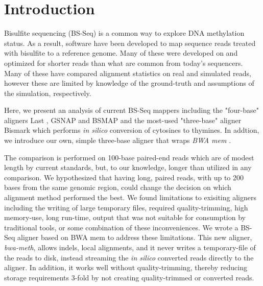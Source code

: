 \documentclass{bioinfo}
\begin{document}
\section{Introduction}
Bisulfite sequencing (BS-Seq) is a common way to explore DNA methylation status.
As a result, software \citep{frithlast,methylcoder,gsnap,krueger2011,bsmap,bsmooth}
have been developed to map sequence reads treated with bisulfite to a reference genome.
Many of these were developed on and optimized for shorter reads
than what are common from today's sequencers. Many of these have compared alignment
statistics on real \citep{methylcoder,bsmap} and simulated \citep{frithlast} reads,
however these are limited by knowledge of the ground-truth and assumptions of
the simulation, respectively.

Here, we present an analysis of current BS-Seq mappers including the "four-base" aligners
Last \citep{frithlast}, GSNAP \citep{gsnap} and BSMAP \citep{bsmap} and the most-used
"three-base" aligner Bismark \citep{krueger2011} which performs \emph{in silico} conversion
of cytosines to thymines. In addtion, we introduce our
own, simple three-base aligner that wraps \textit{BWA mem} \citep{bwamem}.

The comparison is performed on 100-base paired-end reads
which are of modest length by current standards, but, to our knowledge, longer than
utilized in any comparison. We hypothesized that having long, paired reads, with up
to 200 bases from the same genomic region, could change the decision on which
alignment method performed the best. 
We found limitations to exisiting aligners including the writing of large temporary
files, required quality-trimming, high memory-use, long run-time, output that was not
suitable for consumption by traditional tools, or some combination of these
inconveniences. We wrote
a BS-Seq aligner based on BWA mem \citep{bwamem} to address these
limitations. This new aligner, 
\textit{bwa-meth}, allows indels, local alignments, and it never writes a
temporary-file of the reads to disk, instead streaming the \emph{in silico} converted
reads directly to the aligner. In addition, it works well without quality-trimming,
thereby reducing storage requirements 3-fold by not creating quality-trimmed or
converted reads.
\end{document}
